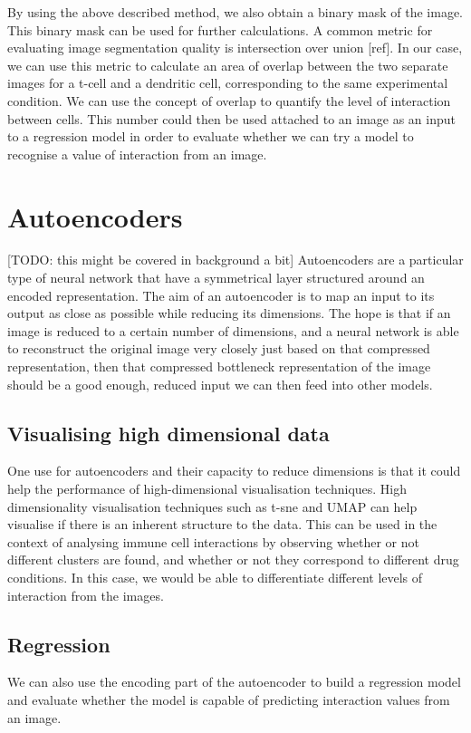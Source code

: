 By using the above described method, we also obtain a binary mask of the image. This binary mask can be used for further calculations. A common metric for evaluating image segmentation quality is intersection over union [ref]. In our case, we can use this metric to calculate an area of overlap between the two separate images for a t-cell and a dendritic cell, corresponding to the same experimental condition. We can use the concept of overlap to quantify the level of interaction between cells. This number could then be used attached to an image as an input to a regression model in order to evaluate whether we can try a model to recognise a value of interaction from an image.

\section{Autoencoders}

[TODO: this might be covered in background a bit]
Autoencoders are a particular type of neural network that have a symmetrical layer structured around an encoded representation. The aim of an autoencoder is to map an input to its output as close as possible while reducing its dimensions. The hope is that if an image is reduced to a certain number of dimensions, and a neural network is able to reconstruct the original image very closely just based on that compressed representation, then that compressed bottleneck representation of the image should be a good enough, reduced input we can then feed into other models. 


\subsection{Visualising high dimensional data}

One use for autoencoders and their capacity to reduce dimensions is that it could help the performance of high-dimensional visualisation techniques. High dimensionality visualisation techniques such as t-sne and UMAP can help visualise if there is an inherent structure to the data. This can be used in the context of analysing immune cell interactions by observing whether or not different clusters are found, and whether or not they correspond to different drug conditions. In this case, we would be able to differentiate different levels of interaction from the images. 

\subsection{Regression}

We can also use the encoding part of the autoencoder to build a regression model and evaluate whether the model is capable of predicting interaction values from an image. 
